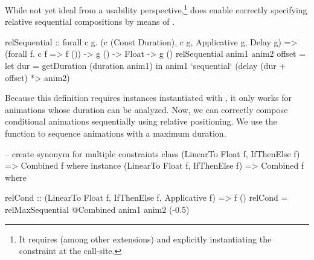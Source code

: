 While not yet ideal from a usability perspective,\footnote{It
requires
 (among other extensions) and explicitly instantiating the
constraint  at the call-site.
}
 \dsl{} does enable correctly
specifying relative sequential compositions by means of .
\begin{spec}
relSequential :: forall c g.
  (c (Const Duration), c g, Applicative g, Delay g) =>
  (forall f. c f => f ()) -> g () -> Float -> g ()
relSequential anim1 anim2 offset = let
  dur = getDuration (duration anim1)
  in anim1 `sequential` (delay (dur + offset) *> anim2)
\end{spec}

Because this definition requires instances instantiated with ,
it only works for animations whose duration can be analyzed. 
Now, we can correctly compose conditional animations sequentially using
relative positioning. We use the  function to sequence
animations with a maximum duration.

\begin{spec}
-- create synonym for multiple constraints
class (LinearTo Float f, IfThenElse f) => Combined f where
instance (LinearTo Float f, IfThenElse f) => Combined f where

relCond :: (LinearTo Float f, IfThenElse f, Applicative f) => f ()
relCond = relMaxSequential @Combined anim1 anim2 (-0.5)
\end{spec}


